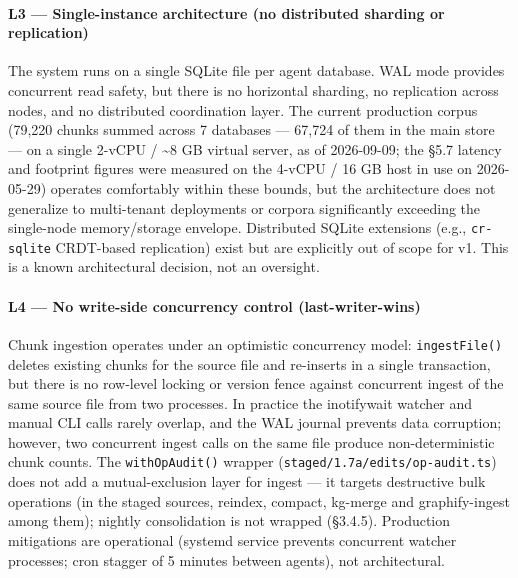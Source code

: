 \documentclass[
]{article}
\begin{document}
\paragraph{L3 --- Single-instance architecture (no distributed sharding
or
replication)}\label{l3-single-instance-architecture-no-distributed-sharding-or-replication}

The system runs on a single SQLite file per agent database. WAL mode
provides concurrent read safety, but there is no horizontal sharding, no
replication across nodes, and no distributed coordination layer. The
current production corpus (79,220 chunks summed across 7 databases ---
67,724 of them in the main store --- on a single 2-vCPU /
\textasciitilde8 GB virtual server, as of 2026-09-09; the §5.7 latency
and footprint figures were measured on the 4-vCPU / 16 GB host in use on
2026-05-29) operates comfortably within these bounds, but the
architecture does not generalize to multi-tenant deployments or corpora
significantly exceeding the single-node memory/storage envelope.
Distributed SQLite extensions (e.g., \texttt{cr-sqlite} CRDT-based
replication) exist but are explicitly out of scope for v1. This is a
known architectural decision, not an oversight.

\paragraph{L4 --- No write-side concurrency control
(last-writer-wins)}\label{l4-no-write-side-concurrency-control-last-writer-wins}

Chunk ingestion operates under an optimistic concurrency model:
\texttt{ingestFile()} deletes existing chunks for the source file and
re-inserts in a single transaction, but there is no row-level locking or
version fence against concurrent ingest of the same source file from two
processes. In practice the inotifywait watcher and manual CLI calls
rarely overlap, and the WAL journal prevents data corruption; however,
two concurrent ingest calls on the same file produce non-deterministic
chunk counts. The \texttt{withOpAudit()} wrapper
(\texttt{staged/1.7a/edits/op-audit.ts}) does not add a mutual-exclusion
layer for ingest --- it targets destructive bulk operations (in the
staged sources, reindex, compact, kg-merge and graphify-ingest among
them); nightly consolidation is not wrapped (§3.4.5). Production
mitigations are operational (systemd service prevents concurrent watcher
processes; cron stagger of 5 minutes between agents), not architectural.
\end{document}
